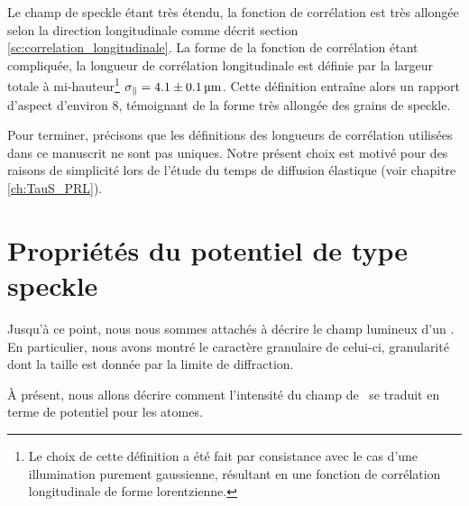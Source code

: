 Le champ de speckle étant très étendu, la fonction de corrélation est très allongée selon la direction longitudinale comme décrit section \ref{sc:correlation_longitudinale}. La forme de la fonction de corrélation étant compliquée, la longueur de corrélation longitudinale est définie par la largeur totale à mi-hauteur\footnote{Le choix de cette définition a été fait par consistance avec le cas d'une illumination purement gaussienne, résultant en une fonction de corrélation longitudinale de forme lorentzienne.} $\sigma_{\parallel}=4.1\pm\SI{0.1}{\micro\metre}$. Cette définition entraîne alors un rapport d'aspect d'environ 8, témoignant de la forme très allongée des grains de speckle.




Pour terminer, précisons que les définitions des longueurs de corrélation utilisées dans ce manuscrit ne sont pas uniques. Notre présent choix est motivé pour des raisons de simplicité lors de l'étude du temps de diffusion élastique (voir chapitre \ref{ch:TauS_PRL}).%














\section{Propriétés du potentiel de type speckle}
\label{sc:potentiel_speckle}
Jusqu'à ce point, nous nous sommes attachés à décrire le champ lumineux d'un \speckle . En particulier, nous avons montré le caractère granulaire de celui-ci, granularité dont la taille est donnée par la limite de diffraction. 

À présent, nous allons décrire comment l'intensité du champ de \speckle\ se traduit en terme de potentiel pour les atomes. 

